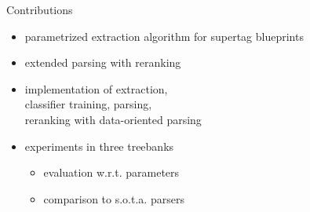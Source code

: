 \documentclass[slides]{subfiles}
\begin{document}
    \begin{frame}{Contributions}
        \begin{minipage}{.5\linewidth}
            \begin{itemize}
                \item<2-> parametrized extraction algorithm for supertag blueprints
                \item<3-> extended parsing with reranking
                \item<5-> implementation of extraction,\\
                            classifier training, parsing,\\
                            reranking with data-oriented parsing
                \item<6-> experiments in three treebanks
                \begin{itemize}
                    \item evaluation w.r.t. parameters
                    \item comparison to s.o.t.a. parsers
                \end{itemize}
            \end{itemize}
        \end{minipage}

        \vspace*{-3.3cm}
        \null\hfill{}\resizebox{.8\linewidth}{!}{}
    \end{frame}
\end{document}
